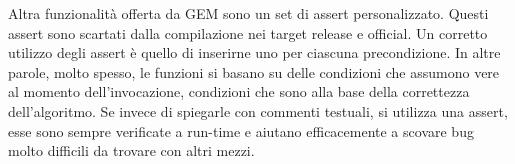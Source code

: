 Altra funzionalità offerta da GEM sono un set di assert personalizzato. Questi assert sono scartati dalla compilazione nei target release e official. Un corretto utilizzo degli assert è quello di inserirne uno per ciascuna precondizione. In altre parole, molto spesso, le funzioni si basano su delle condizioni che assumono vere al momento dell'invocazione, condizioni che sono alla base della correttezza dell'algoritmo. Se invece di spiegarle con commenti testuali, si utilizza una assert, esse sono sempre verificate a run-time e aiutano efficacemente a scovare bug molto difficili da trovare con altri mezzi.